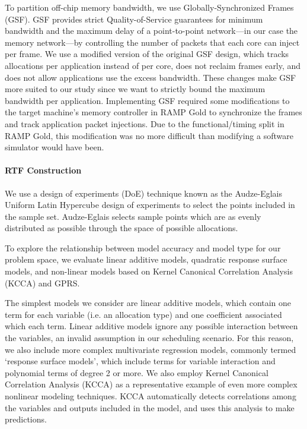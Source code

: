 To partition off-chip memory bandwidth, we use Globally-Synchronized
Frames (GSF)\cite{gsf}. GSF provides strict Quality-of-Service
guarantees for minimum bandwidth and the maximum delay of a
point-to-point network---in our case the memory network---by
controlling the number of packets that each core can inject per frame.
We use a modified version of the original GSF design, which tracks
allocations per application instead of per core, does not reclaim
frames early, and does not allow applications use the excess
bandwidth.  These changes make GSF more suited to our study since we
want to strictly bound the maximum bandwidth per application.
Implementing GSF required some modifications to the target machine's
memory controller in RAMP Gold to synchronize the frames and track
application packet injections.  Due to the functional/timing split in
RAMP Gold, this modification was no more difficult than modifying a
software simulator would have been.

\paragraph{RTF Construction}

 We use a design of experiments (DoE) technique known as the Audze-Eglais
Uniform Latin Hypercube design of experiments \cite{bates-aes03} to
select the points included in the sample set.  Audze-Eglais selects
sample points which are as evenly distributed as possible through the
space of possible allocations.

To explore the relationship between model accuracy and model type
for our problem space, we evaluate linear additive models, quadratic
response surface models, and non-linear models based on Kernel Canonical Correlation Analysis (KCCA) \cite{kcca} and GPRS.

The simplest models we consider are linear additive models, which
contain one term for each variable (i.e. an allocation type) and one
coefficient associated which each term.  Linear additive models
ignore any possible interaction between the variables, an invalid
assumption in our scheduling scenario.  For this reason, we also
include more complex multivariate regression models, commonly termed
`response surface models', which include terms for variable
interaction and polynomial terms of degree 2 or more.  We also employ
Kernel Canonical Correlation Analysis (KCCA) \cite{kcca} as a
representative example of even more complex nonlinear modeling
techniques. KCCA automatically detects correlations among the
variables and outputs included in the model, and uses this analysis
to make predictions.


